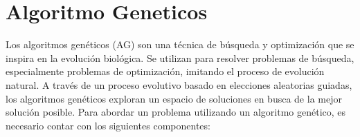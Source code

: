 
\section{Algoritmo Geneticos}
\label{sec:geneticoPrev}
Los algoritmos genéticos (AG) \cite{goldberg1989genetic} son una técnica de búsqueda y optimización que se inspira en la evolución biológica. Se utilizan para resolver problemas de búsqueda, especialmente problemas de optimización, imitando el proceso de evolución natural. A través de un proceso evolutivo basado en elecciones aleatorias guiadas, los algoritmos genéticos exploran un espacio de soluciones en busca de la mejor solución posible.
Para abordar un problema utilizando un algoritmo genético, es necesario contar con los siguientes componentes:


